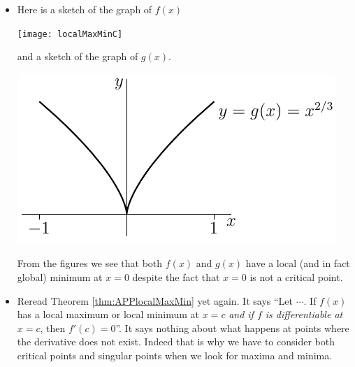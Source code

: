 \begin{eg}
\begin{itemize}
\item Here is a sketch of the graph of $f(x)$
\begin{efig}
\begin{center}
   \texttt{[image: localMaxMinC]}
\end{center}
\end{efig}
and a sketch of the graph of $g(x)$.
\begin{efig}
\begin{center}
   \includegraphics{localMaxMinCC}
\end{center}
\end{efig}
From the figures we see that both $f(x)$ and $g(x)$ have a local 
(and in fact global) minimum at $x=0$ despite the fact that $x=0$ is not a critical point.
\item Reread Theorem \ref{thm:APPlocalMaxMin} yet again. It says
``Let $\cdots$. If $f(x)$ has a local maximum or local minimum at $x=c$
\emph{and if $f$ is differentiable at $x=c$}, then $f'(c)=0$''.
It says nothing about what happens at points where the derivative does
not exist. Indeed that is why we have to consider both critical points and
singular points when we look for maxima and minima.
\end{itemize}
\end{eg}




